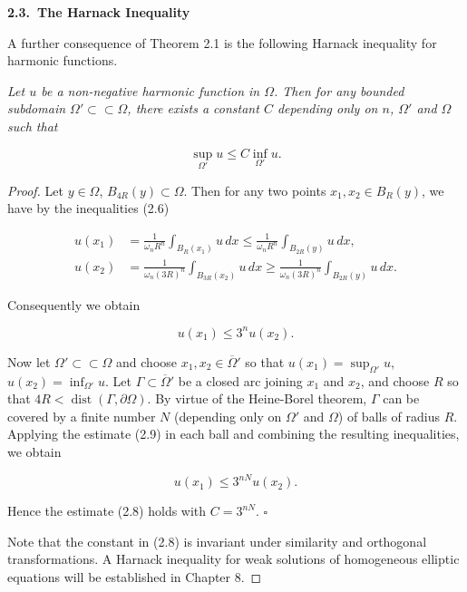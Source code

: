 \bigskip

\noindent\textbf{2.3.\ The Harnack Inequality}

\medskip

\noindent A further consequence of Theorem 2.1 is the following Harnack inequality for
harmonic functions.

\medskip

\begin{theorem}\label{gt.thm2.5}
\emph{Let $u$ be a non-negative harmonic function in $\Omega$. Then for any bounded
subdomain $\Omega' \subset\subset \Omega$, there exists a constant $C$ depending only on $n$, $\Omega'$ and $\Omega$ such
that}

\begin{equation}
\sup_{\Omega'} u \leq C \inf_{\Omega'} u.
\tag{2.8}
\end{equation}

\begin{proof}
Let $y \in \Omega$, $B_{4R}(y) \subset \Omega$. Then for any two points $x_1, x_2 \in B_R(y)$, we have
by the inequalities (2.6)

\begin{align*}
u(x_1) &= \frac{1}{\omega_n R^n} \int_{B_R(x_1)} u\,dx \leq \frac{1}{\omega_n R^n} \int_{B_{2R}(y)} u\,dx, \\
u(x_2) &= \frac{1}{\omega_n (3R)^n} \int_{B_{3R}(x_2)} u\,dx \geq \frac{1}{\omega_n (3R)^n} \int_{B_{2R}(y)} u\,dx.
\end{align*}

\noindent Consequently we obtain

\begin{equation}
u(x_1) \leq 3^n u(x_2).
\tag{2.9}
\end{equation}

\noindent Now let $\Omega' \subset\subset \Omega$ and choose $x_1, x_2 \in \overline{\Omega}'$ so that $u(x_1)=\sup_{\Omega'} u$, $u(x_2)=\inf_{\Omega'} u$.
Let $\Gamma \subset \overline{\Omega}'$ be a closed arc joining $x_1$ and $x_2$, and choose $R$ so that $4R < \operatorname{dist}(\Gamma, \partial \Omega)$.
By virtue of the Heine-Borel theorem, $\Gamma$ can be covered by a finite number $N$
(depending only on $\Omega'$ and $\Omega$) of balls of radius $R$. Applying the estimate (2.9) in
each ball and combining the resulting inequalities, we obtain

\begin{equation*}
u(x_1) \leq 3^{nN} u(x_2).
\end{equation*}

\noindent Hence the estimate (2.8) holds with $C = 3^{nN}$. \hfill$\square$

\medskip

\noindent Note that the constant in (2.8) is invariant under similarity and orthogonal
transformations. A Harnack inequality for weak solutions of homogeneous elliptic
equations will be established in Chapter 8.
\end{proof}
\end{theorem}


